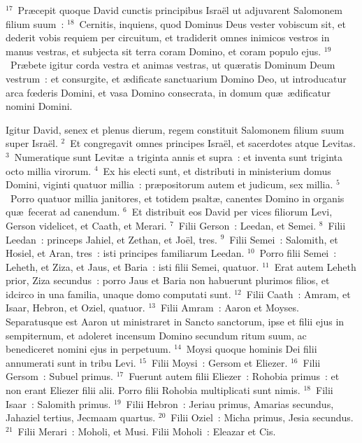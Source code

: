 ${}^{17}$~Pr\ae cepit quoque David cunctis principibus Isra\"el ut adjuvarent Salomonem filium suum~:
${}^{18}$~Cernitis, inquiens, quod Dominus Deus vester vobiscum sit, et dederit vobis requiem per circuitum, et tradiderit omnes inimicos vestros in manus vestras, et subjecta sit terra coram Domino, et coram populo ejus.
${}^{19}$~Pr\ae bete igitur corda vestra et animas vestras, ut qu\ae ratis Dominum Deum vestrum~: et consurgite, et \ae dificate sanctuarium Domino Deo, ut introducatur arca fœderis Domini, et vasa Domino consecrata, in domum qu\ae\ \ae dificatur nomini Domini.

\lettrine[lines=3,image=true,loversize=0.05,lraise=-0.03]{I}{}gitur David, senex et plenus dierum, regem constituit Salomonem filium suum super Isra\"el.
${}^{2}$~Et congregavit omnes principes Isra\"el, et sacerdotes atque Levitas.
${}^{3}$~Numeratique sunt Levit\ae\ a triginta annis et supra~: et inventa sunt triginta octo millia virorum.
${}^{4}$~Ex his electi sunt, et distributi in ministerium domus Domini, viginti quatuor millia~: pr\ae positorum autem et judicum, sex millia.
${}^{5}$~Porro quatuor millia janitores, et totidem psalt\ae , canentes Domino in organis qu\ae\ fecerat ad canendum.
${}^{6}$~Et distribuit eos David per vices filiorum Levi, Gerson videlicet, et Caath, et Merari.
${}^{7}$~Filii Gerson~: Leedan, et Semei.
${}^{8}$~Filii Leedan~: princeps Jahiel, et Zethan, et Jo\"el, tres.
${}^{9}$~Filii Semei~: Salomith, et Hosiel, et Aran, tres~: isti principes familiarum Leedan.
${}^{10}$~Porro filii Semei~: Leheth, et Ziza, et Jaus, et Baria~: isti filii Semei, quatuor.
${}^{11}$~Erat autem Leheth prior, Ziza secundus~: porro Jaus et Baria non habuerunt plurimos filios, et idcirco in una familia, unaque domo computati sunt.
${}^{12}$~Filii Caath~: Amram, et Isaar, Hebron, et Oziel, quatuor.
${}^{13}$~Filii Amram~: Aaron et Moyses. Separatusque est Aaron ut ministraret in Sancto sanctorum, ipse et filii ejus in sempiternum, et adoleret incensum Domino secundum ritum suum, ac benediceret nomini ejus in perpetuum.
${}^{14}$~Moysi quoque hominis Dei filii annumerati sunt in tribu Levi.
${}^{15}$~Filii Moysi~: Gersom et Eliezer.
${}^{16}$~Filii Gersom~: Subuel primus.
${}^{17}$~Fuerunt autem filii Eliezer~: Rohobia primus~: et non erant Eliezer filii alii. Porro filii Rohobia multiplicati sunt nimis.
${}^{18}$~Filii Isaar~: Salomith primus.
${}^{19}$~Filii Hebron~: Jeriau primus, Amarias secundus, Jahaziel tertius, Jecmaam quartus.
${}^{20}$~Filii Oziel~: Micha primus, Jesia secundus.
${}^{21}$~Filii Merari~: Moholi, et Musi. Filii Moholi~: Eleazar et Cis.
